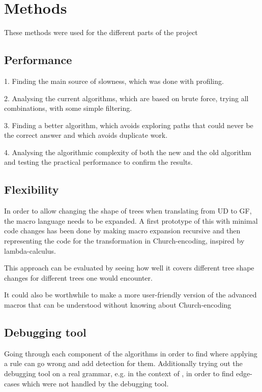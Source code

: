 \chapter{Methods}




These methods were used for the different parts of the project

\section{Performance}

1. Finding the main source of slowness, which was done with profiling.

2. Analysing the current algorithms, which are based on brute force, trying all combinations, with some simple filtering.

3. Finding a better algorithm, which avoids exploring paths that could never be the correct answer and which avoids duplicate work.

4. Analysing the algorithmic complexity of both the new and the old algorithm and testing the practical performance to confirm the results.

\section{Flexibility}

In order to allow changing the shape of trees when translating from UD to GF, the macro language needs to be expanded.
A first prototype of this with minimal code changes has been done by making macro expansion recursive and then representing the code for the transformation in Church-encoding, inspired by lambda-calculus.

This approach can be evaluated by seeing how well it covers different tree shape changes for different trees one would encounter.

It could also be worthwhile to make a more user-friendly version of the advanced macros that can be understood without knowing about Church-encoding

\section{Debugging tool}
Going through each component of the algorithms in order to find where applying a rule can go wrong and add detection for them. Additionally trying out the debugging tool on a real grammar, e.g. in the context of \cite{listenmaa-etal-2021-towards}, in order to find edge-cases which were not handled by the debugging tool.

